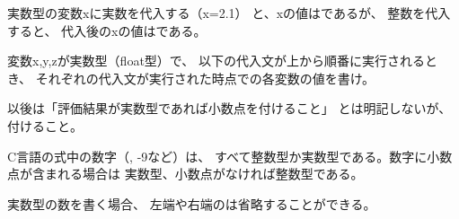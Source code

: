 \documentclass[12pt,a4j]{jarticle}
\newcounter{toi}
\def\toi{%
\bigskip\bigskip\noindent
\addtocounter{toi}{1}
\shadowbox{\bfseries\large 問\thetoi}
\nopagebreak[4]\bigskip\nopagebreak[4]
}
\begin{document}






\toi
\begin{multicols}{2}
 
 実数型の変数{\ttfamily x}に実数{}を代入する（{\ttfamily x=2.1}）
 と、{\ttfamily x}の値は{}であるが、
 整数{}を代入すると、
 代入後の{\ttfamily x}の値は{}である。

 変数{\ttfamily x,y,z}が実数型（float型）で、
 以下の代入文が上から順番に実行されるとき、
 それぞれの代入文が実行された時点での各変数の値を書け。

 \vspace{2cm}


 \begin{center}
 \end{center}

\end{multicols}

{%
以後は「評価結果が実数型であれば小数点を付けること」
とは明記しないが、付けること。}









\toi

C言語の式中の数字（{, -9}など）は、
すべて整数型か実数型である。数字に小数点が含まれる場合は
実数型、小数点がなければ整数型である。

実数型の数を書く場合、
左端や右端の{}は省略することができる。
\end{document}
